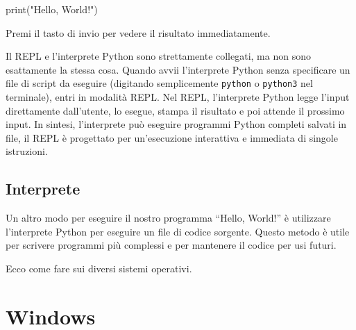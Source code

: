 \documentclass[
  letterpaper,
]{scrbook}
\newenvironment{Shaded}{\begin{snugshade}}{\end{snugshade}}
\newcommand{\BuiltInTok}[1]{\textcolor[rgb]{0.00,0.23,0.31}{#1}}
\newcommand{\NormalTok}[1]{\textcolor[rgb]{0.00,0.23,0.31}{#1}}
\newcommand{\StringTok}[1]{\textcolor[rgb]{0.13,0.47,0.30}{#1}}
\begin{document}
\begin{Shaded}
\begin{Highlighting}[]
\BuiltInTok{print}\NormalTok{(}\StringTok{"Hello, World!"}\NormalTok{)}
\end{Highlighting}
\end{Shaded}

Premi il tasto di invio per vedere il risultato immediatamente.

\begin{tcolorbox}[enhanced jigsaw, opacityback=0, colframe=quarto-callout-warning-color-frame, leftrule=.75mm, bottomrule=.15mm, titlerule=0mm, breakable, coltitle=black, arc=.35mm, toprule=.15mm, bottomtitle=1mm, toptitle=1mm, rightrule=.15mm, title=\textcolor{quarto-callout-warning-color}{\faExclamationTriangle}\hspace{0.5em}{Attenzione}, left=2mm, opacitybacktitle=0.6, colback=white, colbacktitle=quarto-callout-warning-color!10!white]

Il REPL e l'interprete Python sono strettamente collegati, ma non sono
esattamente la stessa cosa. Quando avvii l'interprete Python senza
specificare un file di script da eseguire (digitando semplicemente
\texttt{python} o \texttt{python3} nel terminale), entri in modalità
REPL. Nel REPL, l'interprete Python legge l'input direttamente
dall'utente, lo esegue, stampa il risultato e poi attende il prossimo
input. In sintesi, l'interprete può eseguire programmi Python completi
salvati in file, il REPL è progettato per un'esecuzione interattiva e
immediata di singole istruzioni.

\end{tcolorbox}

\subsection{Interprete}\label{interprete}

Un altro modo per eseguire il nostro programma ``Hello, World!'' è
utilizzare l'interprete Python per eseguire un file di codice sorgente.
Questo metodo è utile per scrivere programmi più complessi e per
mantenere il codice per usi futuri.

Ecco come fare sui diversi sistemi operativi.

\section{Windows}
\end{document}

